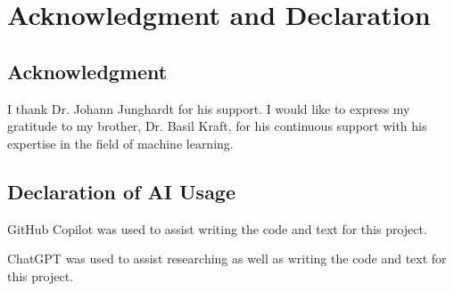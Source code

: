 


\section{Acknowledgment and Declaration}
\label{acknowledgment_declaration}

\subsection{Acknowledgment}%

I thank Dr. Johann Junghardt for his support.
I would like to express my gratitude to my brother, Dr. Basil Kraft, for his continuous
support with his expertise in the field of machine learning. 

\subsection{Declaration of AI Usage}%

GitHub Copilot was used to assist writing the code and text for this project.

ChatGPT was used to assist researching as well as writing the code and text for this project.

\newpage
{}



